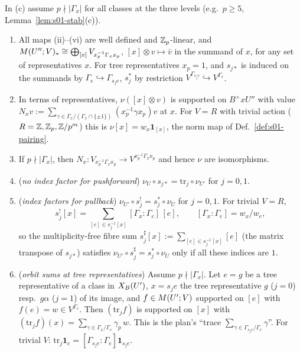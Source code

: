 \begin{proposition}\label{prop:s02-Mhomprops}
In (c) assume $p\nmid|\Gamma_x|$ for all classes at the three levels (e.g.\ $p\ge5$, Lemma~\ref{lem:s01-stab}(c)).
\begin{enumerate}[label=(\alph*)]
\item All maps (ii)--(vi) are well defined and $\mathbb{Z}_p$-linear, and $M(U'';V)_*\cong\bigoplus_{[x]}V_{x_p^{-1}\Gamma_xx_p}$,
  $[x]\otimes v\mapsto\bar v$ in the summand of $x$, for any set of representatives $x$. For tree representatives $x_p=1$, and
  $s_{j*}$ is induced on the summands by $\Gamma_e\hookrightarrow\Gamma_{s_je}$, $s_j^*$ by restriction
  $V^{\Gamma_{s_je}}\hookrightarrow V^{\Gamma_e}$.
\item In terms of representatives, $\nu([x]\otimes v)$ is supported on $B^\times xU''$ with value
  $N_xv:=\sum_{\gamma\in\Gamma_x/(\Gamma_x\cap\{\pm1\})}(x_p^{-1}\gamma x_p)v$ at $x$. For $V=R$ with trivial action
  ($R=\mathbb{Z},\mathbb{Z}_p,\mathbb{Z}/p^m$) this is $\nu[x]=w_x\mathbf 1_{[x]}$, the norm map of Def.~\ref{def:s01-pairing}.
\item If $p\nmid|\Gamma_x|$, then $N_x:V_{x_p^{-1}\Gamma_xx_p}\to V^{x_p^{-1}\Gamma_xx_p}$ and hence $\nu$ are isomorphisms.
\item (\emph{no index factor for pushforward}) $\nu_U\circ s_{j*}=\mathrm{tr}_j\circ\nu_{U'}$ for $j=0,1$.
\item (\emph{index factors for pullback}) $\nu_{U'}\circ s_j^!=s_j^*\circ\nu_U$ for $j=0,1$. For trivial $V=R$,
  \[s_j^![x]=\sum_{[e]\in s_j^{-1}[x]}[\Gamma_x:\Gamma_e]\,[e],\qquad [\Gamma_x:\Gamma_e]=w_x/w_e,\]
  so the multiplicity-free fibre sum $s_j^\sharp[x]:=\sum_{[e]\in s_j^{-1}[x]}[e]$ (the matrix transpose of $s_{j*}$) satisfies
  $\nu_{U'}\circ s_j^\sharp=s_j^*\circ\nu_U$ only if all these indices are $1$.
\item (\emph{orbit sums at tree representatives}) Assume $p\nmid|\Gamma_x|$. Let $e=g$ be a tree representative of a class in $X_B(U')$, $x=s_je$ the tree representative
  $g$ ($j=0$) resp.\ $g\alpha$ ($j=1$) of its image, and $f\in M(U';V)$ supported on $[e]$ with $f(e)=w\in V^{\Gamma_e}$. Then
  $(\mathrm{tr}_jf)$ is supported on $[x]$ with $(\mathrm{tr}_jf)(x)=\sum_{\gamma\in\Gamma_x/\Gamma_e}\gamma_p\,w$. This is the plan's ``trace
  $\sum_{\gamma\in\Gamma_{s_je}/\Gamma_e}\gamma$''. For trivial $V$: $\mathrm{tr}_j\mathbf 1_e=[\Gamma_{s_je}:\Gamma_e]\mathbf 1_{s_je}$.
\end{enumerate}
\end{proposition}
